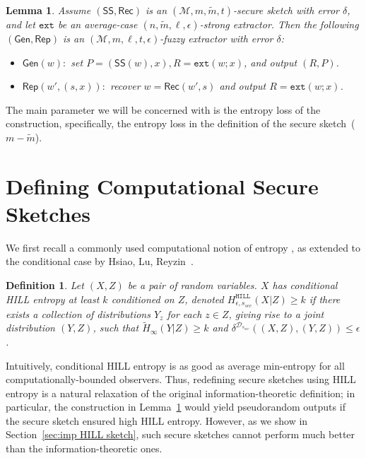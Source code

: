 \documentclass[11pt]{article}
\newcommand{\lemref}[1]{\mbox{Lemma~\ref{#1}}}
\newcommand{\class}[1]{{\ensuremath{\mathsf{#1}}}}
\newcommand{\gen}{\ensuremath{\class{Gen}}\xspace}
\newcommand{\rep}{\ensuremath{\class{Rep}}\xspace}
\newcommand{\sketch}{\ensuremath{\class{SS}}\xspace}
\newcommand{\rec}{\ensuremath{\class{Rec}}\xspace}
\newcommand{\hill}{\ensuremath{\mathtt{HILL}}\xspace}
\newcommand{\ext}{\ensuremath{\mathtt{ext}}}
\newtheorem{lemma}[theorem]{Lemma}
\newtheorem{definition}[theorem]{Definition}
\begin{document}
\begin{lemma}%
\label{lem:fuzzy ext construction}
Assume $(\sketch, \rec)$ is an $(\mathcal{M}, m, \tilde{m}, t)$-secure sketch with error $\delta$, and let $\ext$ be an average-case $(n, \tilde{m}, \ell, \epsilon)$-strong extractor.  Then the following $(\gen, \rep)$ is an $(\mathcal{M}, m, \ell, t, \epsilon)$-fuzzy extractor with error $\delta$:
\begin{itemize}
\item $\gen(w):$ set $P=(\sketch(w), x), R=\ext(w;x)$, and output $(R,P)$.
\item $\rep(w', (s, x)):$ recover $w=\rec(w',s)$ and output $R=\ext(w;x)$.
\end{itemize}
\end{lemma}
The main parameter we will be concerned with is the entropy loss of the construction, specifically, the entropy loss in the definition of the secure sketch~($m-\tilde{m}$).  %


\section{Defining Computational Secure Sketches}
\label{sec:defCompFuzzyExtractors}
We first recall a commonly used computational notion of entropy \cite{DBLP:journals/siamcomp/HastadILL99}, as extended to the conditional case by Hsiao, Lu, Reyzin~\cite{DBLP:conf/eurocrypt/HsiaoLR07}.

\begin{definition}
Let $(X, Z)$ be a pair of random variables.  $X$ has 
\emph{conditional HILL entropy} at least $k$ conditioned on $Z$,
denoted $H^{\hill}_{\epsilon, s_{sec}}(X|Z)\geq k$ if there exists a collection of
distributions $Y_z$ for each $z\in Z$, giving rise to a joint distribution
$(Y, Z)$, such that $\tilde{H}_\infty(Y|Z)\geq k$ and $\delta^{\mathcal{D}_{s_{sec}}} ((X, Z),(Y,Z))\leq \epsilon$.
\end{definition}

Intuitively, conditional HILL entropy is as good as average min-entropy for all computationally-bounded observers.  Thus, redefining secure sketches using HILL entropy is a  natural relaxation of the original information-theoretic definition; in particular, the construction in \lemref{lem:fuzzy ext construction} would yield pseudorandom outputs if the secure sketch ensured high HILL entropy.  However, as we show in Section~\ref{sec:imp HILL sketch}, such secure sketches cannot  perform much better than the information-theoretic ones.
\end{document}
